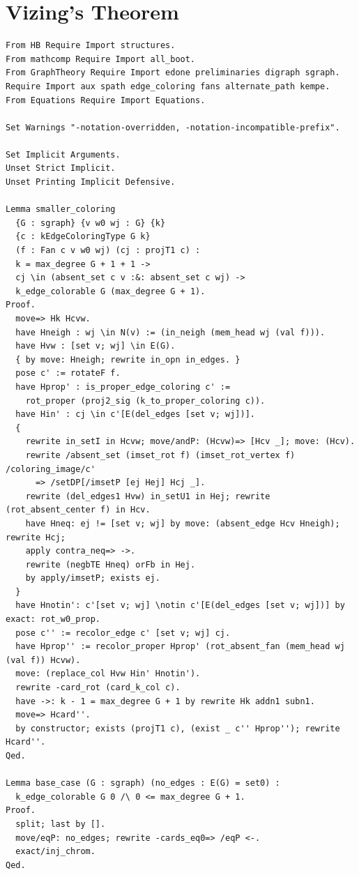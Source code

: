 \section{Vizing's Theorem}\label{apdx:viz}
\begin{verbatim}
From HB Require Import structures.
From mathcomp Require Import all_boot.
From GraphTheory Require Import edone preliminaries digraph sgraph.
Require Import aux spath edge_coloring fans alternate_path kempe.
From Equations Require Import Equations.

Set Warnings "-notation-overridden, -notation-incompatible-prefix".

Set Implicit Arguments.
Unset Strict Implicit.
Unset Printing Implicit Defensive.

Lemma smaller_coloring
  {G : sgraph} {v w0 wj : G} {k}
  {c : kEdgeColoringType G k} 
  (f : Fan c v w0 wj) (cj : projT1 c) :
  k = max_degree G + 1 + 1 ->
  cj \in (absent_set c v :&: absent_set c wj) ->
  k_edge_colorable G (max_degree G + 1).
Proof.
  move=> Hk Hcvw.
  have Hneigh : wj \in N(v) := (in_neigh (mem_head wj (val f))).
  have Hvw : [set v; wj] \in E(G).
  { by move: Hneigh; rewrite in_opn in_edges. }
  pose c' := rotateF f.
  have Hprop' : is_proper_edge_coloring c' := 
    rot_proper (proj2_sig (k_to_proper_coloring c)).
  have Hin' : cj \in c'[E(del_edges [set v; wj])].
  { 
    rewrite in_setI in Hcvw; move/andP: (Hcvw)=> [Hcv _]; move: (Hcv).
    rewrite /absent_set (imset_rot f) (imset_rot_vertex f) /coloring_image/c'
      => /setDP[/imsetP [ej Hej] Hcj _].
    rewrite (del_edges1 Hvw) in_setU1 in Hej; rewrite (rot_absent_center f) in Hcv.
    have Hneq: ej != [set v; wj] by move: (absent_edge Hcv Hneigh); rewrite Hcj; 
    apply contra_neq=> ->.
    rewrite (negbTE Hneq) orFb in Hej.
    by apply/imsetP; exists ej.
  }
  have Hnotin': c'[set v; wj] \notin c'[E(del_edges [set v; wj])] by exact: rot_w0_prop.
  pose c'' := recolor_edge c' [set v; wj] cj.
  have Hprop'' := recolor_proper Hprop' (rot_absent_fan (mem_head wj (val f)) Hcvw).
  move: (replace_col Hvw Hin' Hnotin').
  rewrite -card_rot (card_k_col c).
  have ->: k - 1 = max_degree G + 1 by rewrite Hk addn1 subn1.
  move=> Hcard''.
  by constructor; exists (projT1 c), (exist _ c'' Hprop''); rewrite Hcard''.
Qed.

Lemma base_case (G : sgraph) (no_edges : E(G) = set0) :
  k_edge_colorable G 0 /\ 0 <= max_degree G + 1.
Proof.
  split; last by []. 
  move/eqP: no_edges; rewrite -cards_eq0=> /eqP <-.
  exact/inj_chrom.
Qed.


\end{verbatim}
